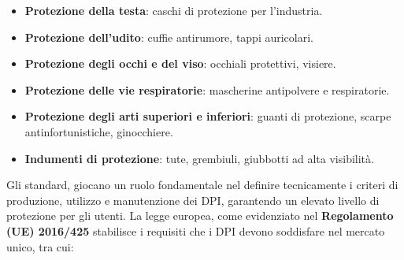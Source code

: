 \begin{itemize}
    \item \textbf{Protezione della testa}: caschi di protezione per l'industria.
    
    \item \textbf{Protezione dell'udito}: cuffie antirumore, tappi auricolari.
    
    \item \textbf{Protezione degli occhi e del viso}: occhiali protettivi, visiere.
    
    \item \textbf{Protezione delle vie respiratorie}: mascherine antipolvere e respiratorie.
    
    \item \textbf{Protezione degli arti superiori e inferiori}: guanti di protezione, scarpe antinfortunistiche, ginocchiere.
    
    \item \textbf{Indumenti di protezione}: tute, grembiuli, giubbotti ad alta visibilità.
\end{itemize}

\noindent Gli standard, giocano un ruolo fondamentale nel definire tecnicamente i criteri di produzione, utilizzo e manutenzione dei DPI, garantendo un elevato livello di protezione per gli utenti. La legge europea, come evidenziato nel \textbf{Regolamento (UE) 2016/425} stabilisce i requisiti che i DPI devono soddisfare nel mercato unico\cite{a4regolamento425}, tra cui:

